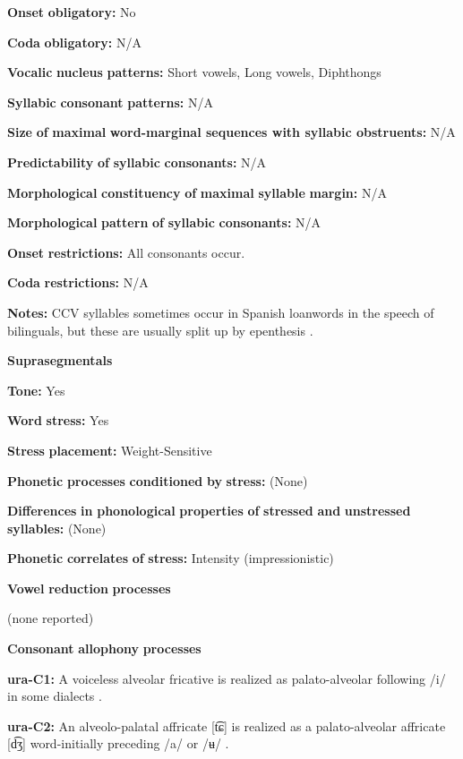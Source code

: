 \begin{styleBody}
\textbf{Onset} \textbf{obligatory:} No

\textbf{Coda} \textbf{obligatory:} N/A

\textbf{Vocalic} \textbf{nucleus} \textbf{patterns:} Short vowels, Long vowels, Diphthongs

\textbf{Syllabic} \textbf{consonant} \textbf{patterns:} N/A

\textbf{Size} \textbf{of} \textbf{maximal} \textbf{word{}-marginal sequences with syllabic obstruents:} N/A

\textbf{Predictability} \textbf{of} \textbf{syllabic} \textbf{consonants:} N/A

\textbf{Morphological} \textbf{constituency} \textbf{of} \textbf{maximal} \textbf{syllable} \textbf{margin:} N/A

\textbf{Morphological} \textbf{pattern} \textbf{of} \textbf{syllabic} \textbf{consonants:} N/A

\textbf{Onset} \textbf{restrictions:} All consonants occur.

\textbf{Coda} \textbf{restrictions:} N/A

\textbf{Notes:} CCV syllables sometimes occur in Spanish loanwords in the speech of bilinguals, but these are usually split up by epenthesis \citep[76]{Olawsky2006}.

\textbf{Suprasegmentals}

\textbf{Tone:} Yes

\textbf{Word} \textbf{stress:} Yes

\textbf{Stress} \textbf{placement:} Weight-Sensitive

\textbf{Phonetic} \textbf{processes} \textbf{conditioned} \textbf{by} \textbf{stress:} (None)

\textbf{Differences} \textbf{in} \textbf{phonological} \textbf{properties} \textbf{of} \textbf{stressed} \textbf{and} \textbf{unstressed} \textbf{syllables:} (None)

\textbf{Phonetic} \textbf{correlates} \textbf{of} \textbf{stress:} Intensity (impressionistic)

\textbf{Vowel} \textbf{reduction} \textbf{processes}

(none reported)

\textbf{Consonant} \textbf{allophony} \textbf{processes}

\textbf{ura-C1:} A voiceless alveolar fricative is realized as palato-alveolar following /i/ in some dialects \citep[38]{Olawsky2006}.

\textbf{ura-C2:} An alveolo-palatal affricate [t͡ɕ] is realized as a palato-alveolar affricate [d͡ʒ] word-initially preceding /a/ or /ʉ/ \citep[39]{Olawsky2006}.


\end{styleBody}
